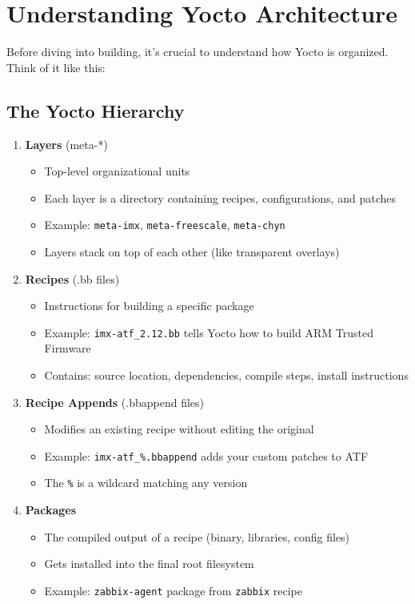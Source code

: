 \documentclass[12pt,a4paper]{report}
\begin{document}
\section{Understanding Yocto Architecture}

Before diving into building, it's crucial to understand how Yocto is organized. Think of it like this:

\subsection{The Yocto Hierarchy}

\begin{enumerate}
    \item \textbf{Layers} (meta-*)
    \begin{itemize}
        \item Top-level organizational units
        \item Each layer is a directory containing recipes, configurations, and patches
        \item Example: \texttt{meta-imx}, \texttt{meta-freescale}, \texttt{meta-chyn}
        \item Layers stack on top of each other (like transparent overlays)
    \end{itemize}
    
    \item \textbf{Recipes} (.bb files)
    \begin{itemize}
        \item Instructions for building a specific package
        \item Example: \texttt{imx-atf\_2.12.bb} tells Yocto how to build ARM Trusted Firmware
        \item Contains: source location, dependencies, compile steps, install instructions
    \end{itemize}
    
    \item \textbf{Recipe Appends} (.bbappend files)
    \begin{itemize}
        \item Modifies an existing recipe without editing the original
        \item Example: \texttt{imx-atf\_\%.bbappend} adds your custom patches to ATF
        \item The \texttt{\%} is a wildcard matching any version
    \end{itemize}
    
    \item \textbf{Packages}
    \begin{itemize}
        \item The compiled output of a recipe (binary, libraries, config files)
        \item Gets installed into the final root filesystem
        \item Example: \texttt{zabbix-agent} package from \texttt{zabbix} recipe
    \end{itemize}
\end{enumerate}
\end{document}
